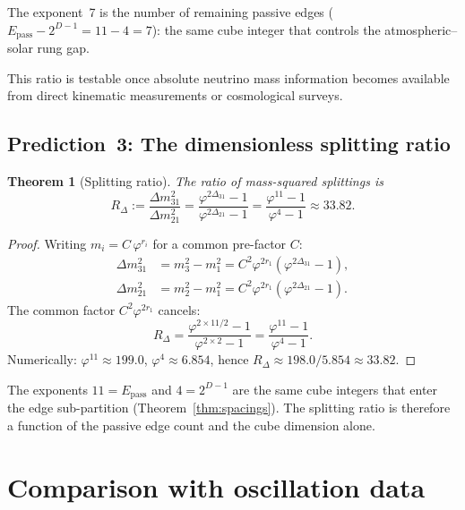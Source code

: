\documentclass[11pt]{article}
\newtheorem{theorem}{Theorem}
\theoremstyle{remark}
\newcommand{\phig}{\varphi}
\newcommand{\Epass}{E_{\mathrm{pass}}}
\newcommand{\Rdel}{R_\Delta}
\begin{document}
The exponent~7 is the number of remaining passive edges
($\Epass-2^{D-1}=11-4=7$): the same cube integer that
controls the atmospheric--solar rung gap.

This ratio is testable once absolute neutrino mass information
becomes available from direct kinematic measurements or
cosmological surveys.

\subsection{Prediction~3: The dimensionless splitting ratio}

\begin{theorem}[Splitting ratio]
\label{thm:splitting}
The ratio of mass-squared splittings is
\begin{equation}\label{eq:splitting}
  \boxed{
  \Rdel
  := \frac{\Delta m^2_{31}}{\Delta m^2_{21}}
  = \frac{\phig^{2\Delta_{31}}-1}{\phig^{2\Delta_{21}}-1}
  = \frac{\phig^{11}-1}{\phig^{4}-1}
  \approx 33.82.}
\end{equation}
\end{theorem}

\begin{proof}
Writing $m_i = C\,\phig^{r_i}$ for a common pre-factor $C$:
\begin{align*}
  \Delta m^2_{31}
  &= m_3^2 - m_1^2
  = C^2\phig^{2r_1}(\phig^{2\Delta_{31}}-1), \\
  \Delta m^2_{21}
  &= m_2^2 - m_1^2
  = C^2\phig^{2r_1}(\phig^{2\Delta_{21}}-1).
\end{align*}
The common factor $C^2\phig^{2r_1}$ cancels:
\[
  \Rdel
  = \frac{\phig^{2\times 11/2}-1}{\phig^{2\times 2}-1}
  = \frac{\phig^{11}-1}{\phig^{4}-1}.
\]
Numerically: $\phig^{11}\approx 199.0$,
$\phig^{4}\approx 6.854$, hence
$\Rdel\approx 198.0/5.854\approx 33.82$.
\end{proof}

The exponents $11=\Epass$ and $4=2^{D-1}$ are the same cube
integers that enter the edge sub-partition
(Theorem~\ref{thm:spacings}).  The splitting ratio is therefore
a function of the passive edge count and the cube dimension
alone.

\section{Comparison with oscillation data}
\label{sec:data}
\end{document}
